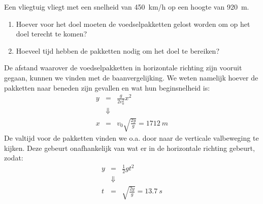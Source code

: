 \documentclass{ximera}
\begin{document}
\begin{example}
	Een vliegtuig vliegt met een snelheid van \SI{450}{km/h} op een hoogte van \SI{920}{m}.
	\begin{enumerate}
		\item Hoever voor het doel moeten de voedselpakketten gelost worden om op het doel terecht te komen?
		\item Hoeveel tijd hebben de pakketten nodig om het doel te bereiken?
	\end{enumerate}
	De afstand waarover de voedselpakketten in horizontale richting zijn vooruit gegaan, kunnen we vinden met de baanvergelijking. We weten namelijk hoever de pakketten naar beneden zijn gevallen en wat hun beginsnelheid is:
	\begin{eqnarray*}
		y&=&\frac{g}{2v_0^2}x^2\\
		&\Downarrow&\\
		x&=&v_0\sqrt{\frac{2y}{g}}=\SI{1712}{m}
	\end{eqnarray*}
	De valtijd voor de pakketten vinden we o.a. door naar de verticale valbeweging te kijken. Deze gebeurt onafhankelijk van wat er in de horizontale richting gebeurt, zodat:
	\begin{eqnarray*}
		y&=&\frac{1}{2}gt^2\\
		&\Downarrow&\\
		t&=&\sqrt{\frac{2y}{g}}=\SI{13,7}{s}
	\end{eqnarray*}
\end{example}
	
\end{document}
